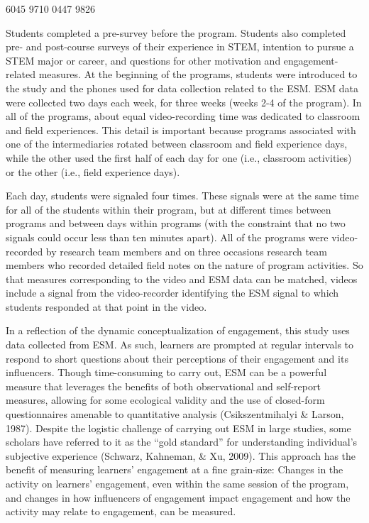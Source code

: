 \documentclass[]{book}
\theoremstyle{definition}
\theoremstyle{definition}
\theoremstyle{definition}
\theoremstyle{remark}
\begin{document}
6045 9710 0447 9826

Students completed a pre-survey before the program. Students also
completed pre- and post-course surveys of their experience in STEM,
intention to pursue a STEM major or career, and questions for other
motivation and engagement-related measures. At the beginning of the
programs, students were introduced to the study and the phones used for
data collection related to the ESM. ESM data were collected two days
each week, for three weeks (weeks 2-4 of the program). In all of the
programs, about equal video-recording time was dedicated to classroom
and field experiences. This detail is important because programs
associated with one of the intermediaries rotated between classroom and
field experience days, while the other used the first half of each day
for one (i.e., classroom activities) or the other (i.e., field
experience days).

Each day, students were signaled four times. These signals were at the
same time for all of the students within their program, but at different
times between programs and between days within programs (with the
constraint that no two signals could occur less than ten minutes apart).
All of the programs were video-recorded by research team members and on
three occasions research team members who recorded detailed field notes
on the nature of program activities. So that measures corresponding to
the video and ESM data can be matched, videos include a signal from the
video-recorder identifying the ESM signal to which students responded at
that point in the video.

In a reflection of the dynamic conceptualization of engagement, this
study uses data collected from ESM. As such, learners are prompted at
regular intervals to respond to short questions about their perceptions
of their engagement and its influencers. Though time-consuming to carry
out, ESM can be a powerful measure that leverages the benefits of both
observational and self-report measures, allowing for some ecological
validity and the use of closed-form questionnaires amenable to
quantitative analysis (Csikszentmihalyi \& Larson, 1987). Despite the
logistic challenge of carrying out ESM in large studies, some scholars
have referred to it as the ``gold standard'' for understanding
individual's subjective experience (Schwarz, Kahneman, \& Xu, 2009).
This approach has the benefit of measuring learners' engagement at a
fine grain-size: Changes in the activity on learners' engagement, even
within the same session of the program, and changes in how influencers
of engagement impact engagement and how the activity may relate to
engagement, can be measured.
\end{document}
